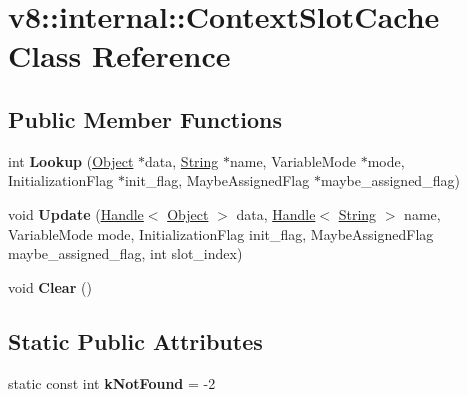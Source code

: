 \hypertarget{classv8_1_1internal_1_1_context_slot_cache}{}\section{v8\+:\+:internal\+:\+:Context\+Slot\+Cache Class Reference}
\label{classv8_1_1internal_1_1_context_slot_cache}
\subsection*{Public Member Functions}
\begin{DoxyCompactItemize}
\item 
\hypertarget{classv8_1_1internal_1_1_context_slot_cache_a4ebdedd69d39ba5289812097be813f75}{}int {\bfseries Lookup} (\hyperlink{classv8_1_1internal_1_1_object}{Object} $\ast$data, \hyperlink{classv8_1_1internal_1_1_string}{String} $\ast$name, Variable\+Mode $\ast$mode, Initialization\+Flag $\ast$init\+\_\+flag, Maybe\+Assigned\+Flag $\ast$maybe\+\_\+assigned\+\_\+flag)\label{classv8_1_1internal_1_1_context_slot_cache_a4ebdedd69d39ba5289812097be813f75}

\item 
\hypertarget{classv8_1_1internal_1_1_context_slot_cache_ac136190bbd844c5ccc249b59b4b811bb}{}void {\bfseries Update} (\hyperlink{classv8_1_1internal_1_1_handle}{Handle}$<$ \hyperlink{classv8_1_1internal_1_1_object}{Object} $>$ data, \hyperlink{classv8_1_1internal_1_1_handle}{Handle}$<$ \hyperlink{classv8_1_1internal_1_1_string}{String} $>$ name, Variable\+Mode mode, Initialization\+Flag init\+\_\+flag, Maybe\+Assigned\+Flag maybe\+\_\+assigned\+\_\+flag, int slot\+\_\+index)\label{classv8_1_1internal_1_1_context_slot_cache_ac136190bbd844c5ccc249b59b4b811bb}

\item 
\hypertarget{classv8_1_1internal_1_1_context_slot_cache_aad0a26c9e44aa6ad4568327171644375}{}void {\bfseries Clear} ()\label{classv8_1_1internal_1_1_context_slot_cache_aad0a26c9e44aa6ad4568327171644375}

\end{DoxyCompactItemize}
\subsection*{Static Public Attributes}
\begin{DoxyCompactItemize}
\item 
\hypertarget{classv8_1_1internal_1_1_context_slot_cache_a596b1217f2c589e46a4327d567c336c2}{}static const int {\bfseries k\+Not\+Found} = -\/2\label{classv8_1_1internal_1_1_context_slot_cache_a596b1217f2c589e46a4327d567c336c2}

\end{DoxyCompactItemize}
